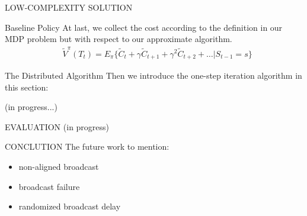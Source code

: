 \documentclass[10pt, conference, letterpaper]{IEEEtran}
\renewcommand{\vec}{\mathbf}
\begin{document}
\begin{section}{LOW-COMPLEXITY SOLUTION}
\begin{subsection}{Baseline Policy}
            At last, we collect the cost according to the definition in our MDP problem but with respect to our approximate algorithm.
            \begin{align}
                & \tilde{V}^{\pi}(T_t)
                \nonumber%
                = E_{\pi} \{ \tilde{C}_{t} + \gamma \tilde{C}_{t+1} + \gamma^2 \tilde{C}_{t+2} + \dots |S_{t-1}=s \}
            \end{align}
        \end{subsection}

        \begin{subsection}{The Distributed Algorithm}
            Then we introduce the one-step iteration algorithm in this section:
            \begin{algorithm}[H]
                \caption{Distributed Algorithm for $k$-th AP}
                \begin{algorithmic}
                    \WHILE{\TRUE}
                        \STATE (in progress...)
                    \ENDWHILE
                \end{algorithmic}
            \end{algorithm}
        \end{subsection}
        
    \end{section}

    \begin{section}{EVALUATION}
        \label{sec:evaluation}
        (in progress)
    \end{section}

    \begin{section}{CONCLUTION}
        \label{sec:conclusion}
        The future work to mention:
        \begin{itemize}
            \item non-aligned broadcast
            \item broadcast failure
            \item randomized broadcast delay
        \end{itemize}
    \end{section}

    
    
\end{document}
